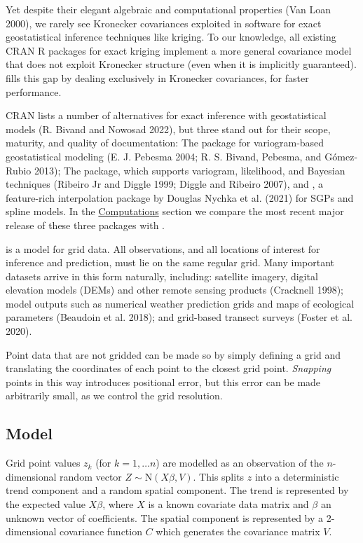 Yet despite their elegant algebraic and computational properties (Van Loan 2000), we rarely see Kronecker covariances exploited in software for exact geostatistical inference techniques like kriging. To our knowledge, all existing CRAN R packages for exact kriging implement a more general covariance model that does not exploit Kronecker structure (even when it is implicitly guaranteed).  fills this gap by dealing exclusively in Kronecker covariances, for faster performance.

CRAN lists a number of alternatives for exact inference with geostatistical models (R. Bivand and Nowosad 2022), but three stand out for their scope, maturity, and quality of documentation: The  package for variogram-based geostatistical modeling (E. J. Pebesma 2004; R. S. Bivand, Pebesma, and Gómez-Rubio 2013); The  package, which supports variogram, likelihood, and Bayesian techniques (Ribeiro Jr and Diggle 1999; Diggle and Ribeiro 2007), and , a feature-rich interpolation package by Douglas Nychka et al. (2021) for SGPs and spline models. In the \protect\hyperlink{computations}{Computations} section we compare the most recent major release of these three packages with .

 is a model for grid data. All observations, and all locations of interest for inference and prediction, must lie on the same regular grid. Many important datasets arrive in this form naturally, including: satellite imagery, digital elevation models (DEMs) and other remote sensing products (Cracknell 1998); model outputs such as numerical weather prediction grids and maps of ecological parameters (Beaudoin et al. 2018); and grid-based transect surveys (Foster et al. 2020).

Point data that are not gridded can be made so by simply defining a grid and translating the coordinates of each point to the closest grid point. \emph{Snapping} points in this way introduces positional error, but this error can be made arbitrarily small, as we control the grid resolution.

\hypertarget{model}{%
\subsection{Model}\label{model}}

Grid point values \(z_k\) (for \(k=1,\dots n\)) are modelled as an observation of the \(n\)-dimensional random vector \(Z \sim \text{N} \left( X\beta, V \right)\). This splits \(z\) into a deterministic trend component and a random spatial component. The trend is represented by the expected value \(X\beta\), where \(X\) is a known covariate data matrix and \(\beta\) an unknown vector of coefficients. The spatial component is represented by a 2-dimensional covariance function \(C\) which generates the covariance matrix \(V\).

